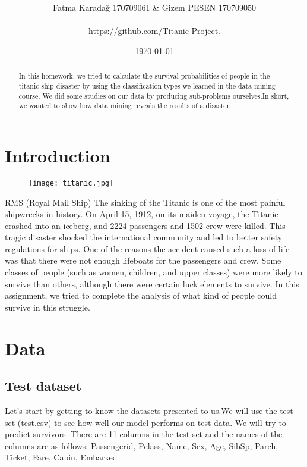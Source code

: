 \documentclass[onecolumn]{article}
\title{\spacecaps{CENG 3521 \\Data Mining \\TITANIC PROJECT }\\ 
\color{blue!75!black}
\normalsize
\spacesc{} }
\author{Fatma Karadağ 170709061  & Gizem PESEN 170709050\\\\ \url{https://github.com/Titanic-Project}.\\}
\date{\today}
\begin{document}
\maketitle
\begin{abstract}

In this homework, we tried to calculate the survival probabilities of people in the titanic ship disaster by using the classification types we learned in the data mining course.
We did some studies on our data by producing sub-problems ourselves.In short, we wanted to show how data mining reveals the results of a disaster.

    
\end{abstract}

\tableofcontents
\section{Introduction}


\begin{figure}[ht!]
\centering
\texttt{[image: titanic.jpg]}
\end{figure}

RMS (Royal Mail Ship) The sinking of the Titanic is one of the most painful shipwrecks in history. On April 15, 1912, on its maiden voyage, the Titanic crashed into an iceberg, and 2224 passengers and 1502 crew were killed. This tragic disaster shocked the international community and led to better safety regulations for ships. One of the reasons the accident caused such a loss of life was that there were not enough lifeboats for the passengers and crew. Some classes of people (such as women, children, and upper classes) were more likely to survive than others, although there were certain luck elements to survive. In this assignment, we tried to complete the analysis of what kind of people could survive in this struggle.

\section{Data}

\subsection{Test dataset}
Let's start by getting to know the datasets presented to us.We will use the test set (test.csv) to see how well our model performs on test data. We will try to predict survivors.
There are 11 columns in the test set and the names of the columns are as follows:
Passengerid, Pclass, Name, Sex, Age, SibSp, Parch, Ticket, Fare, Cabin, Embarked
\end{document}
